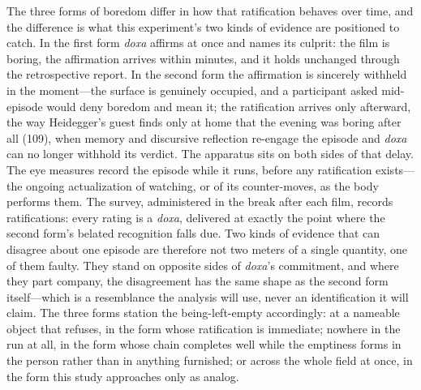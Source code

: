 The three forms of boredom differ in how that ratification behaves over time, and the
difference is what this experiment's two kinds of evidence are positioned to catch. In the
first form \textit{doxa} affirms at once and names its culprit: the film is boring, the
affirmation arrives within minutes, and it holds unchanged through the retrospective report. In
the second form the affirmation is sincerely withheld in the moment---the surface is genuinely
occupied, and a participant asked mid-episode would deny boredom and mean it; the ratification
arrives only afterward, the way Heidegger's guest finds only at home that the evening was
boring after all (109), when memory and discursive reflection re-engage the episode and
\textit{doxa} can no longer withhold its verdict. The apparatus sits on both sides of that
delay. The eye measures record the episode while it runs, before any ratification exists---the
ongoing actualization of watching, or of its counter-moves, as the body performs them. The
survey, administered in the break after each film, records ratifications: every rating is a
\textit{doxa}, delivered at exactly the point where the second form's belated recognition falls
due. Two kinds of evidence that can disagree about one episode are therefore not two meters of
a single quantity, one of them faulty. They stand on opposite sides of \textit{doxa}'s
commitment, and where they part company, the disagreement has the same shape as the second form
itself---which is a resemblance the analysis will use, never an identification it will claim.
The three forms station the being-left-empty accordingly: at a nameable object that refuses, in
the form whose ratification is immediate; nowhere in the run at all, in the form whose chain
completes well while the emptiness forms in the person rather than in anything furnished; or
across the whole field at once, in the form this study approaches only as analog.

